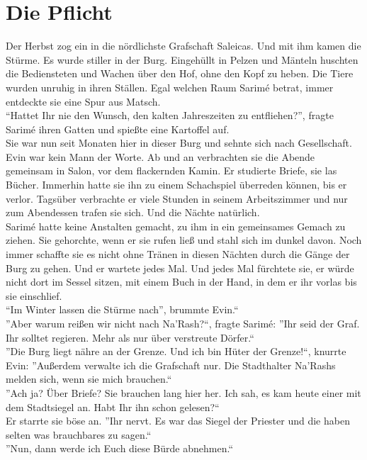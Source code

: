 
\chapter{Die Pflicht}

Der Herbst zog ein in die nördlichste Grafschaft Saleicas. Und mit ihm kamen die Stürme. Es wurde 
stiller in der Burg. Eingehüllt in Pelzen und Mänteln huschten die Bediensteten und Wachen über den 
Hof, ohne den Kopf zu heben. Die Tiere wurden unruhig in ihren Ställen. Egal welchen Raum Sarimé 
betrat, immer entdeckte sie eine Spur aus Matsch.\\
``Hattet Ihr nie den Wunsch, den kalten Jahreszeiten zu entfliehen?'', fragte Sarimé ihren Gatten 
und spießte eine Kartoffel auf.\\
Sie war nun seit Monaten hier in dieser Burg und sehnte sich nach Gesellschaft. Evin war kein Mann 
der Worte. Ab und an verbrachten sie die Abende gemeinsam in Salon, vor dem flackernden Kamin. Er 
studierte Briefe, sie las Bücher. Immerhin hatte sie ihn zu einem Schachspiel überreden können, bis 
er verlor. Tagsüber verbrachte er viele Stunden in seinem Arbeitszimmer und nur zum Abendessen 
trafen sie sich. Und die Nächte natürlich.\\
Sarimé hatte keine Anstalten gemacht, zu ihm in ein gemeinsames Gemach zu ziehen. Sie gehorchte, 
wenn er sie rufen ließ und stahl sich im dunkel davon. Noch immer schaffte sie es nicht ohne Tränen 
in diesen Nächten durch die Gänge der Burg zu gehen. Und er wartete jedes Mal. Und jedes Mal 
fürchtete sie, er würde nicht dort im Sessel sitzen, mit einem Buch in der Hand, in dem er ihr 
vorlas bis sie einschlief.\\
``Im Winter lassen die Stürme nach'', brummte Evin.``\\
''Aber warum reißen wir nicht nach Na'Rash?``, fragte Sarimé: ''Ihr seid der Graf. Ihr solltet 
regieren. Mehr als nur über verstreute Dörfer.``\\
''Die Burg liegt nähre an der Grenze. Und ich bin Hüter der Grenze!``, knurrte Evin: ''Außerdem 
verwalte ich die Grafschaft nur. Die Stadthalter Na'Rashs melden sich, wenn sie mich brauchen.``\\
''Ach ja? Über Briefe? Sie brauchen lang hier her. Ich sah, es kam heute einer mit dem Stadtsiegel 
an. Habt Ihr ihn schon gelesen?``\\
Er starrte sie böse an. ''Ihr nervt. Es war das Siegel der Priester und die haben selten was 
brauchbares zu sagen.``\\
''Nun, dann werde ich Euch diese Bürde abnehmen.``\\
